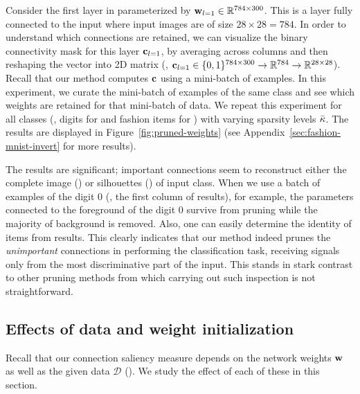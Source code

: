 Consider the first layer in  parameterized by ${\mathbf{w}}_{l=1} \in {\mathbb{R}}^{784 \times 300}$.
This is a layer fully connected to the input where input images are of size $28 \times 28 = 784$.
In order to understand which connections are retained, we can visualize the binary connectivity mask for this layer ${\mathbf{c}}_{l=1}$, by averaging across columns and then reshaping the vector into 2D matrix (\ie, ${\mathbf{c}}_{l=1} \in \{0, 1\}^{784 \times 300} \rightarrow {\mathbb{R}}^{784} \rightarrow {\mathbb{R}}^{28 \times 28}$).
Recall that our method computes ${\mathbf{c}}$ using a mini-batch of examples.
In this experiment, we curate the mini-batch of examples of the same class and see which weights are retained for that mini-batch of data.
We repeat this experiment for all classes (\ie, digits for \mnist{} and fashion items for \fmnist{}) with varying sparsity levels $\bar{\kappa}$.
The results are displayed in Figure~\ref{fig:pruned-weights} (see Appendix~\ref{sec:fashion-mnist-invert} for more results).

The results are significant; important connections seem to reconstruct either the complete image (\mnist{}) or silhouettes (\fmnist{}) of input class.
When we use a batch of examples of the digit $0$ (\ie, the first column of \mnist{} results), for example, the parameters connected to the foreground of the digit $0$ survive from pruning while the majority of background is removed.
Also, one can easily determine the identity of items from \fmnist{} results.
This clearly indicates that our method indeed prunes the \emph{unimportant} connections in performing the classification task, receiving signals only from the most discriminative part of the input.
This stands in stark contrast to other pruning methods from which carrying out such inspection is not straightforward.



\subsection{Effects of data and weight initialization}

Recall that our connection saliency measure depends on the network weights ${\mathbf{w}}$ as well as the given data $\mathcal{D}$ ().
We study the effect of each of these in this section.


